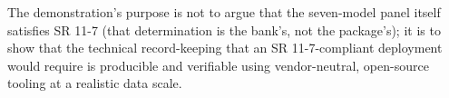 The demonstration's purpose is not to argue that the seven-model panel itself satisfies SR 11-7 (that determination is the bank's, not the package's); it is to show that the technical record-keeping that an SR 11-7-compliant deployment would require is producible and verifiable using vendor-neutral, open-source tooling at a realistic data scale.
